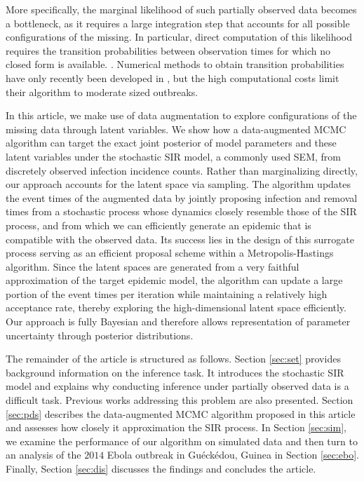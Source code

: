 \documentclass[11pt]{article}
\newcommand{\jx}[1]{{\color{blue}{ #1}}}
\begin{document}
	More specifically, the marginal likelihood of such partially observed data becomes a bottleneck, as it requires a large integration step that accounts for all possible configurations of the missing. In particular, direct computation of this likelihood requires the transition probabilities between observation times for which no closed form is available. \jx{to do: cite recent papers from Simon Spencer's group too that do so for discrete-time models, and mention classical matrix exponentiation being intractable}. Numerical methods to obtain transition probabilities have only recently been developed in \cite{Ho.2018b, Ho.2018}, but the high computational costs limit their algorithm to moderate sized outbreaks.
	
	In this article, we make use of data augmentation to explore configurations of the missing data through latent variables. We show how a data-augmented MCMC algorithm can target the exact joint posterior of model parameters and these latent variables under the stochastic SIR model, a commonly used SEM, from discretely observed infection incidence counts. Rather than marginalizing directly, our approach accounts for the latent space via sampling. The algorithm updates the event times of the augmented data by jointly proposing infection and removal times from a stochastic process whose dynamics closely resemble those of the SIR process, and from which we can efficiently generate an epidemic that is compatible with the observed data. Its success lies in the design of this surrogate process serving as an efficient proposal scheme within a Metropolis-Hastings algorithm. Since the latent spaces are generated from a very faithful approximation of the target epidemic model, the algorithm can update a large portion of the event times per iteration while maintaining a relatively high acceptance rate, thereby exploring the high-dimensional latent space efficiently. Our approach is fully Bayesian and therefore allows representation of parameter uncertainty through posterior distributions.
	
	The remainder of the article is structured as follows. Section \ref{sec:set} provides background information on the inference task. It introduces the stochastic SIR model and explains why conducting inference under partially observed data is a difficult task. Previous works addressing this problem are also presented. Section \ref{sec:pds} describes the data-augmented MCMC algorithm proposed in this article and assesses how closely it approximation the SIR process. In Section \ref{sec:sim}, we examine the performance of our algorithm on simulated data and then turn to an analysis of the $2014$ Ebola outbreak in Gu\'eck\'edou, Guinea in Section \ref{sec:ebo}. Finally, Section \ref{sec:dis} discusses the findings and concludes the article.
	
\end{document}
